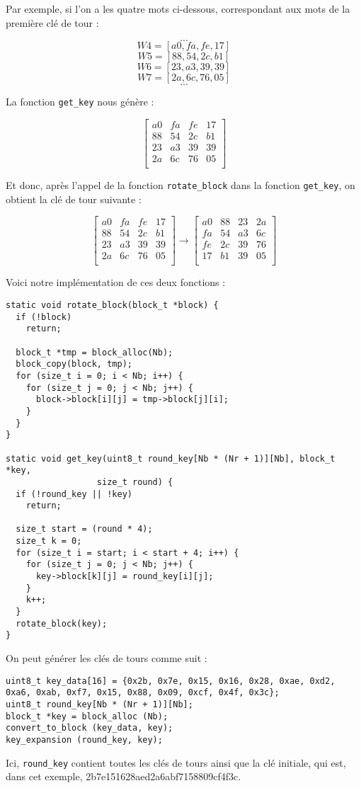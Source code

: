 \documentclass[a4paper, 10pt]{article}
\begin{document}
Par exemple, si l’on a les quatre mots ci-dessous, correspondant aux mots de la première clé de tour :

\[ ... \]
\[ W4 = [a0, fa, fe, 17]\]
\[ W5 = [88, 54, 2c, b1]\]
\[ W6 = [23, a3, 39, 39]\]
\[ W7 = [2a, 6c, 76, 05]\]
\[...\]

La fonction \texttt{get\_key} nous génère :

\[
  \begin{bmatrix}
    a0&fa&fe&17\\
    88&54&2c&b1\\
    23&a3&39&39\\
    2a&6c&76&05\\
  \end{bmatrix}
\]

Et donc, après l’appel de la fonction \texttt{rotate_block} 
dans la fonction \texttt{get_key}, on obtient la clé de tour suivante :

\[
\begin{bmatrix}
  a0&fa&fe&17\\
  88&54&2c&b1\\
  23&a3&39&39\\
  2a&6c&76&05\\
\end{bmatrix}
\rightarrow
\begin{bmatrix}
  a0&88&23&2a\\
  fa&54&a3&6c\\
  fe&2c&39&76\\
  17&b1&39&05\\
\end{bmatrix}
\]

Voici notre implémentation de ces deux fonctions :

\small{
\begin{verbatim}
static void rotate_block(block_t *block) {
  if (!block)
    return;

  block_t *tmp = block_alloc(Nb);
  block_copy(block, tmp);
  for (size_t i = 0; i < Nb; i++) {
    for (size_t j = 0; j < Nb; j++) {
      block->block[i][j] = tmp->block[j][i];
    }
  }
}

static void get_key(uint8_t round_key[Nb * (Nr + 1)][Nb], block_t *key,
                  size_t round) {
  if (!round_key || !key)
    return;

  size_t start = (round * 4);
  size_t k = 0;
  for (size_t i = start; i < start + 4; i++) {
    for (size_t j = 0; j < Nb; j++) {
      key->block[k][j] = round_key[i][j];
    }
    k++;
  }
  rotate_block(key);
}
\end{verbatim}
}
\normalsize
  On peut générer les clés de tours comme suit :
  \small{
    \begin{verbatim}
uint8_t key_data[16] = {0x2b, 0x7e, 0x15, 0x16, 0x28, 0xae, 0xd2, 0xa6, 0xab, 0xf7, 0x15, 0x88, 0x09, 0xcf, 0x4f, 0x3c};
uint8_t round_key[Nb * (Nr + 1)][Nb];
block_t *key = block_alloc (Nb);
convert_to_block (key_data, key);
key_expansion (round_key, key);
    \end{verbatim}
  }
  \normalsize
  Ici, \texttt{round_key} contient toutes les clés de tours ainsi que la clé initiale, qui est, 
  dans cet exemple, 2b7e151628aed2a6abf7158809cf4f3c.
\end{document}
